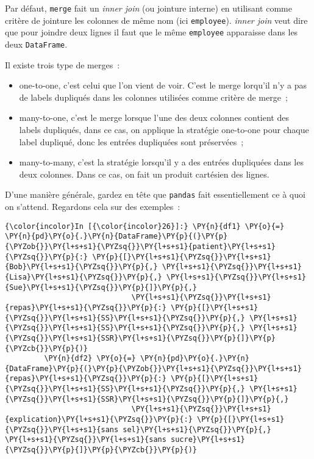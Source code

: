     Par défaut, \texttt{merge} fait un \emph{inner join} (ou jointure
interne) en utilisant comme critère de jointure les colonnes de même nom
(ici \texttt{employee}). \emph{inner join} veut dire que pour joindre
deux lignes il faut que le même \texttt{employee} apparaisse dans les
deux \texttt{DataFrame}.

    Il existe trois type de merges~:

\begin{itemize}
\item
  one-to-one, c'est celui que l'on vient de voir. C'est le merge
  lorqu'il n'y a pas de labels dupliqués dans les colonnes utilisées
  comme critère de merge~;
\item
  many-to-one, c'est le merge lorsque l'une des deux colonnes contient
  des labels dupliqués, dans ce cas, on applique la stratégie one-to-one
  pour chaque label dupliqué, donc les entrées dupliquées sont
  préservées~;
\item
  many-to-many, c'est la stratégie lorsqu'il y a des entrées dupliquées
  dans les deux colonnes. Dans ce cas, on fait un produit cartésien des
  lignes.
\end{itemize}

D'une manière générale, gardez en tête que \texttt{pandas} fait
essentiellement ce à quoi on s'attend. Regardons cela sur des exemples~:

    \begin{Verbatim}[commandchars=\\\{\},frame=single,framerule=0.3mm,rulecolor=\color{cellframecolor}]
{\color{incolor}In [{\color{incolor}26}]:} \PY{n}{df1} \PY{o}{=} \PY{n}{pd}\PY{o}{.}\PY{n}{DataFrame}\PY{p}{(}\PY{p}{\PYZob{}}\PY{l+s+s1}{\PYZsq{}}\PY{l+s+s1}{patient}\PY{l+s+s1}{\PYZsq{}}\PY{p}{:} \PY{p}{[}\PY{l+s+s1}{\PYZsq{}}\PY{l+s+s1}{Bob}\PY{l+s+s1}{\PYZsq{}}\PY{p}{,} \PY{l+s+s1}{\PYZsq{}}\PY{l+s+s1}{Lisa}\PY{l+s+s1}{\PYZsq{}}\PY{p}{,} \PY{l+s+s1}{\PYZsq{}}\PY{l+s+s1}{Sue}\PY{l+s+s1}{\PYZsq{}}\PY{p}{]}\PY{p}{,}
                             \PY{l+s+s1}{\PYZsq{}}\PY{l+s+s1}{repas}\PY{l+s+s1}{\PYZsq{}}\PY{p}{:} \PY{p}{[}\PY{l+s+s1}{\PYZsq{}}\PY{l+s+s1}{SS}\PY{l+s+s1}{\PYZsq{}}\PY{p}{,} \PY{l+s+s1}{\PYZsq{}}\PY{l+s+s1}{SS}\PY{l+s+s1}{\PYZsq{}}\PY{p}{,} \PY{l+s+s1}{\PYZsq{}}\PY{l+s+s1}{SSR}\PY{l+s+s1}{\PYZsq{}}\PY{p}{]}\PY{p}{\PYZcb{}}\PY{p}{)}
         \PY{n}{df2} \PY{o}{=} \PY{n}{pd}\PY{o}{.}\PY{n}{DataFrame}\PY{p}{(}\PY{p}{\PYZob{}}\PY{l+s+s1}{\PYZsq{}}\PY{l+s+s1}{repas}\PY{l+s+s1}{\PYZsq{}}\PY{p}{:} \PY{p}{[}\PY{l+s+s1}{\PYZsq{}}\PY{l+s+s1}{SS}\PY{l+s+s1}{\PYZsq{}}\PY{p}{,} \PY{l+s+s1}{\PYZsq{}}\PY{l+s+s1}{SSR}\PY{l+s+s1}{\PYZsq{}}\PY{p}{]}\PY{p}{,}
                             \PY{l+s+s1}{\PYZsq{}}\PY{l+s+s1}{explication}\PY{l+s+s1}{\PYZsq{}}\PY{p}{:} \PY{p}{[}\PY{l+s+s1}{\PYZsq{}}\PY{l+s+s1}{sans sel}\PY{l+s+s1}{\PYZsq{}}\PY{p}{,} \PY{l+s+s1}{\PYZsq{}}\PY{l+s+s1}{sans sucre}\PY{l+s+s1}{\PYZsq{}}\PY{p}{]}\PY{p}{\PYZcb{}}\PY{p}{)}
\end{Verbatim}



